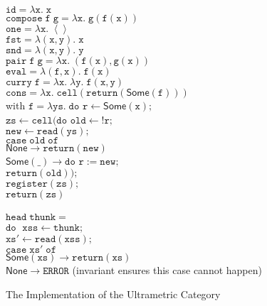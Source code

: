\documentclass[preprint]{sigplanconf}
\newcommand{\term}[1]{\ensuremath{\mathtt{{#1}}}}
\newcommand{\unitval}{\left<\right>}
\newcommand{\None}{\mathsf{None}}
\newcommand{\Some}[1]{\mathsf{Some}({#1})}
\newcommand{\fun}[2]{\lambda {#1}.\;{#2}}
\begin{document}
\begin{figure}
\begin{tabbing}

\term{id = \fun{x}{x}} 
\\[1em]
\term{compose\;f\;g = \fun{x}{g(f(x))}}
\\[1em]
\term{one = \fun{x}{\unitval}}
\\[1em]
\term{fst = \fun{(x,y)}{x}}
\\[1em]
\term{snd = \fun{(x,y)}{y}}
\\[1em]
\term{pair\;f\;g = \fun{x}{(f(x),g(x))}}
\\[1em]
\term{eval = \fun{(f,x)}{f(x)}}
\\[1em]
\term{curry\;f = \fun{x}{\fun{y}{f(x,y)}}}
\\[1em]
\term{cons = \lambda x.\; cell(return(\Some{f}))} \\[0.1em]
with 
\term{f = \lambda ys.\;do} \= \term{r \leftarrow \Some{x};} \\
\>     \term{zs \leftarrow cell(}\= 
      \term{do} \=\term{old \leftarrow !r;} \\
\> \> \> \term{new \leftarrow read(ys);} \\
\> \> \> \term{case\;old\;of} \\
\> \> \> \;\;\= \term{\None \to return(new)} \\
\> \> \> \>     \term{\Some{\_} \to do} \=\term{r := new;} \\
\> \> \> \>  \>                           \term{return(old));} \\                 
\> \term{register(zs);} \\
\> \term{return(zs)}\\


\\
\term{head\;thunk =} \\
\;\;\term{do\;}
  \=\term{xss \leftarrow thunk;} \\
  \>\term{xs' \leftarrow read(xss);} \\
  \>\term{case\;xs'\;of} \\
  \>\;\;\=\term{\Some{xs} \to return(xs)}\\
  \>    \>\term{\None \to ERROR} (invariant ensures this case cannot happen) \\

\end{tabbing}
\caption{The Implementation of the Ultrametric Category}
\label{ultrametric-implementation}
\end{figure}
\end{document}

